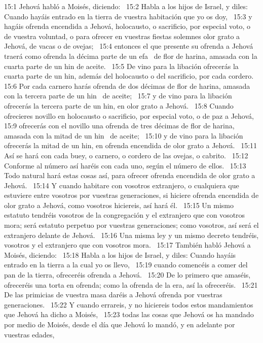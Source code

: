 15:1 Jehová habló a Moisés, diciendo:  
15:2 Habla a los hijos de Israel, y diles: Cuando hayáis entrado en la tierra de vuestra habitación que yo os doy,  
15:3 y hagáis ofrenda encendida a Jehová, holocausto, o sacrificio, por especial voto, o de vuestra voluntad, o para ofrecer en vuestras fiestas solemnes olor grato a Jehová, de vacas o de ovejas;  
15:4 entonces el que presente su ofrenda a Jehová traerá como ofrenda la décima parte de un efa  de flor de harina, amasada con la cuarta parte de un hin de aceite.  
15:5 De vino para la libación ofrecerás la cuarta parte de un hin, además del holocausto o del sacrificio, por cada cordero.  
15:6 Por cada carnero harás ofrenda de dos décimas de flor de harina, amasada con la tercera parte de un hin  de aceite;  
15:7 y de vino para la libación ofrecerás la tercera parte de un hin, en olor grato a Jehová.  
15:8 Cuando ofrecieres novillo en holocausto o sacrificio, por especial voto, o de paz a Jehová,  
15:9 ofrecerás con el novillo una ofrenda de tres décimas de flor de harina, amasada con la mitad de un hin  de aceite;  
15:10 y de vino para la libación ofrecerás la mitad de un hin, en ofrenda encendida de olor grato a Jehová.  
15:11 Así se hará con cada buey, o carnero, o cordero de las ovejas, o cabrito.  
15:12 Conforme al número así haréis con cada uno, según el número de ellos.  
15:13 Todo natural hará estas cosas así, para ofrecer ofrenda encendida de olor grato a Jehová.  
15:14 Y cuando habitare con vosotros extranjero, o cualquiera que estuviere entre vosotros por vuestras generaciones, si hiciere ofrenda encendida de olor grato a Jehová, como vosotros hiciereis, así hará él.  
15:15 Un mismo estatuto tendréis vosotros de la congregación y el extranjero que con vosotros mora; será estatuto perpetuo por vuestras generaciones; como vosotros, así será el extranjero delante de Jehová.  
15:16 Una misma ley y un mismo decreto tendréis, vosotros y el extranjero que con vosotros mora.  
15:17 También habló Jehová a Moisés, diciendo:  
15:18 Habla a los hijos de Israel, y diles: Cuando hayáis entrado en la tierra a la cual yo os llevo,  
15:19 cuando comencéis a comer del pan de la tierra, ofreceréis ofrenda a Jehová.  
15:20 De lo primero que amaséis, ofreceréis una torta en ofrenda; como la ofrenda de la era, así la ofreceréis.  
15:21 De las primicias de vuestra masa daréis a Jehová ofrenda por vuestras generaciones.  
15:22 Y cuando errareis, y no hiciereis todos estos mandamientos que Jehová ha dicho a Moisés,  
15:23 todas las cosas que Jehová os ha mandado por medio de Moisés, desde el día que Jehová lo mandó, y en adelante por vuestras edades,  
